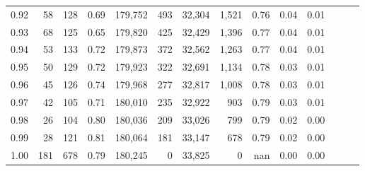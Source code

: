 \begin{tabular}{rrrrrrrrrrrrrr}
0.92 &      58 &  128 &  0.69 &  179,752 &      493 &  32,304 &   1,521 &  0.76 &  0.04 &      0.01 \\
0.93 &      68 &  125 &  0.65 &  179,820 &      425 &  32,429 &   1,396 &  0.77 &  0.04 &      0.01 \\
0.94 &      53 &  133 &  0.72 &  179,873 &      372 &  32,562 &   1,263 &  0.77 &  0.04 &      0.01 \\
0.95 &      50 &  129 &  0.72 &  179,923 &      322 &  32,691 &   1,134 &  0.78 &  0.03 &      0.01 \\
0.96 &      45 &  126 &  0.74 &  179,968 &      277 &  32,817 &   1,008 &  0.78 &  0.03 &      0.01 \\
0.97 &      42 &  105 &  0.71 &  180,010 &      235 &  32,922 &     903 &  0.79 &  0.03 &      0.01 \\
0.98 &      26 &  104 &  0.80 &  180,036 &      209 &  33,026 &     799 &  0.79 &  0.02 &      0.00 \\
0.99 &      28 &  121 &  0.81 &  180,064 &      181 &  33,147 &     678 &  0.79 &  0.02 &      0.00 \\
1.00 &     181 &  678 &  0.79 &  180,245 &        0 &  33,825 &       0 &   nan &  0.00 &      0.00 \\
\bottomrule
\end{tabular}
